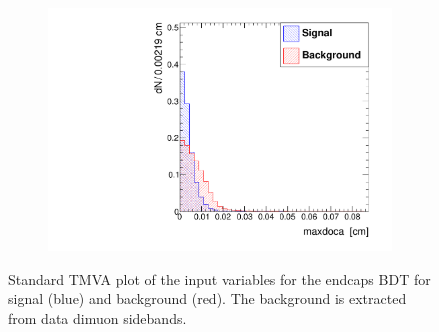 \documentclass[10pt,a4paper]{article}
\begin{document}
\begin{figure}
\begin{subfigure}[b]{0.2\textwidth}
                \includegraphics[width=\textwidth]{Figures/maxdoca_endcaps}
                \label{fig:maxdocaEndcaps}
        \end{subfigure}
        \caption{Standard TMVA plot of the input variables for the endcaps BDT for signal (blue) and background (red). The background is extracted from data dimuon sidebands.}
        \label{fig:TMVAPlotsEndcaps}
\end{figure}
\end{document}
